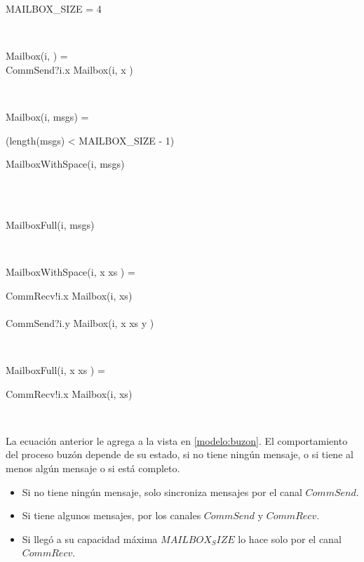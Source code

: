 \begin{process}

\begin{block}
MAILBOX\_SIZE = 4
\end{block} \\

\begin{block}
Mailbox(i, \nil) = {} \\ \quad
CommSend?i.x \then Mailbox(i, \lseq x \rseq) 
\end{block} \\

\begin{block}
Mailbox(i, msgs) = {} \\ \quad
  \begin{block} 
  \If (length(msgs) < MAILBOX\_SIZE - 1) \Then {} \\ \quad
    \begin{block} 
      MailboxWithSpace(i, msgs)
    \end{block} \\
  \Else {} \\ \quad
    \begin{block}
      MailboxFull(i, msgs)
    \end{block}
  \end{block} 
\end{block} \\

\begin{block}
MailboxWithSpace(i, \lseq x \rseq \cat xs ) = {} \\ \quad 
  \begin{block}
    CommRecv!i.x \then Mailbox(i, xs) \\
    \Extchoice \\
    CommSend?i.y \then Mailbox(i, \lseq x \rseq \cat xs \cat \lseq y \rseq ) 
  \end{block}
\end{block} \\

\begin{block}
MailboxFull(i, \lseq x \rseq \cat xs ) = {} \\ \quad 
  \begin{block}
    CommRecv!i.x \then Mailbox(i, xs) \\
  \end{block}
\end{block} \\
\end{process}

La ecuación anterior le agrega a la vista en \ref{modelo:buzon}. El comportamiento del proceso buzón depende de su estado, si no tiene ningún mensaje, o si tiene al menos algún mensaje o si está completo.

\begin{itemize}
\item Si no tiene ningún mensaje, solo sincroniza mensajes por el canal $CommSend$.
\item Si tiene algunos mensajes, por los canales $CommSend$ y $CommRecv$.
\item Si llegó a su capacidad máxima $MAILBOX_SIZE$ lo hace solo por el canal $CommRecv$.
\end{itemize}

